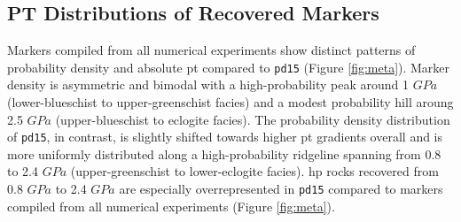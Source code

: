 \hypertarget{pt-distributions-of-recovered-markers}{%
\subsection{PT Distributions of Recovered Markers}\label{pt-distributions-of-recovered-markers}}

Markers compiled from all numerical experiments show distinct patterns of probability density and absolute \gls{pt} compared to \texttt{pd15} (Figure \ref{fig:meta}). Marker density is asymmetric and bimodal with a high-probability peak around 1 \(GPa\) (lower-blueschist to upper-greenschist facies) and a modest probability hill aroung 2.5 \(GPa\) (upper-blueschist to eclogite facies). The probability density distribution of \texttt{pd15}, in contrast, is slightly shifted towards higher \gls{pt} gradients overall and is more uniformly distributed along a high-probability ridgeline spanning from 0.8 to 2.4 \(GPa\) (upper-greenschist to lower-eclogite facies). \gls{hp} rocks recovered from 0.8 \(GPa\) to 2.4 \(GPa\) are especially overrepresented in \texttt{pd15} compared to markers compiled from all numerical experiments (Figure \ref{fig:meta}).



